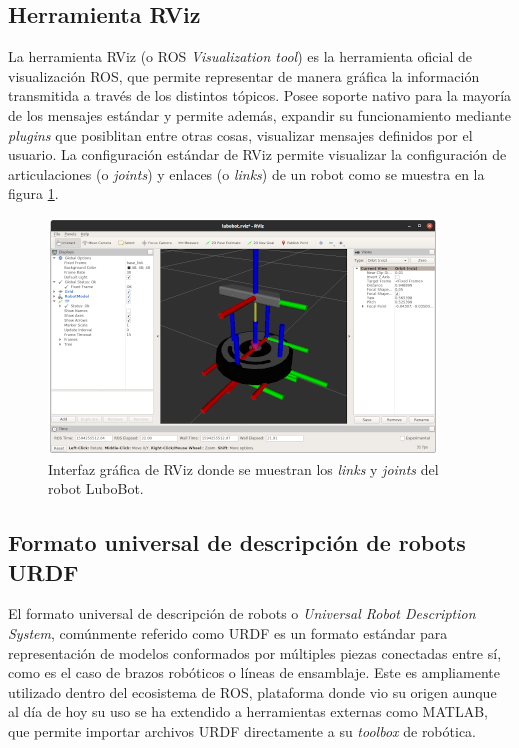 \subsection{Herramienta RViz}

La herramienta RViz (o ROS \textit{Visualization tool}) es la herramienta oficial de visualización ROS, que permite representar de manera gráfica la información transmitida a través de los distintos tópicos. Posee soporte nativo para la mayoría de los mensajes estándar y permite además, expandir su funcionamiento mediante \textit{plugins} que posiblitan entre otras cosas, visualizar mensajes definidos por el usuario. La configuración estándar de RViz permite visualizar la configuración de articulaciones (o \textit{joints}) y enlaces (o \textit{links}) de un robot como se muestra en la figura \ref{fig:rviz}.

\begin{figure}[ht]
    \centering
    \includegraphics{./Figures/rviz.png}
    \caption{Interfaz gráfica de RViz donde se muestran los \textit{links} y \textit{joints} del robot LuboBot.}
    \label{fig:rviz}
\end{figure}


\subsection{Formato universal de descripción de robots URDF}

El formato universal de descripción de robots o \textit{Universal Robot Description System}, comúnmente referido como URDF es un formato estándar para representación de modelos conformados por múltiples piezas conectadas entre sí, como es el caso de brazos robóticos o líneas de ensamblaje. Este es ampliamente utilizado dentro del ecosistema de ROS, plataforma donde vio su origen aunque al día de hoy su uso se ha extendido a herramientas externas como MATLAB, que permite importar archivos URDF directamente a su \textit{toolbox} de robótica.

